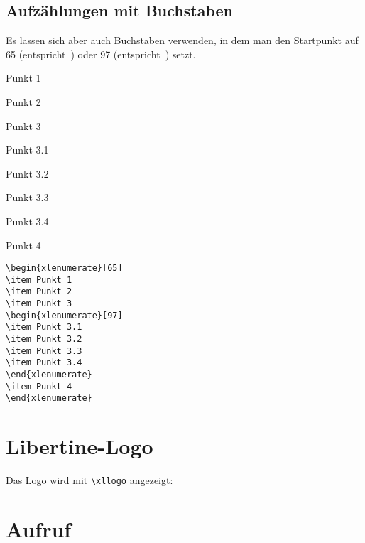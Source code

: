 \documentclass{fontdokuold}
\begin{document}
\subsection{Aufzählungen mit Buchstaben}

Es lassen sich aber auch Buchstaben verwenden, in dem man den Startpunkt
auf 65 (entspricht~) oder 97 (entspricht~) setzt.



\begin{xlenumerate}[65]
\item Punkt 1
\item Punkt 2
\item Punkt 3
\begin{xlenumerate}[97]
\item Punkt 3.1
\item Punkt 3.2
\item Punkt 3.3
\item Punkt 3.4
\end{xlenumerate}
\item Punkt 4
\end{xlenumerate}

\begin{lstlisting}
\begin{xlenumerate}[65]
\item Punkt 1
\item Punkt 2
\item Punkt 3
\begin{xlenumerate}[97]
\item Punkt 3.1
\item Punkt 3.2
\item Punkt 3.3
\item Punkt 3.4
\end{xlenumerate}
\item Punkt 4
\end{xlenumerate}
\end{lstlisting}



\section{Libertine-Logo}

Das Logo wird mit \verb|\xllogo| angezeigt: {\Huge\xllogo}


\section{Aufruf}
\end{document}
